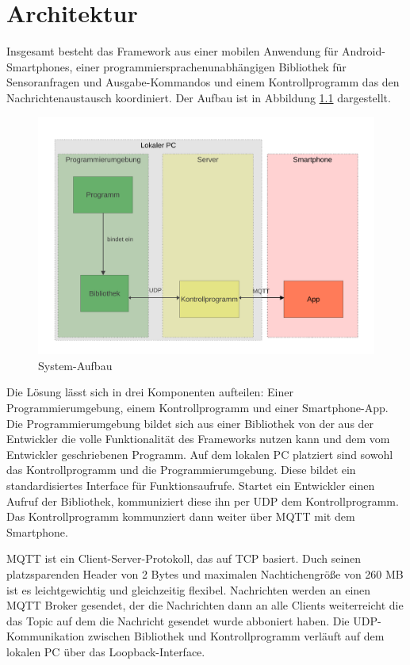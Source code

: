 \documentclass[11pt,a4paper]{report}
\begin{document}
\chapter{Architektur} \label{chap:architektur}
Insgesamt besteht das Framework aus einer mobilen Anwendung für Android-Smartphones, einer programmiersprachenunabhängigen Bibliothek für Sensoranfragen und Ausgabe-Kommandos und einem Kontrollprogramm das den Nachrichtenaustausch koordiniert.
Der Aufbau ist in Abbildung \ref{fig:design} dargestellt.
\begin{figure}[htbp]
\centering
\includegraphics[width=\textwidth]{images/framework.pdf}
\caption{System-Aufbau}
\label{fig:design}
\end{figure}
Die Lösung lässt sich in drei Komponenten aufteilen:
Einer Programmierumgebung, einem Kontrollprogramm und einer Smartphone-App.
Die Programmierumgebung bildet sich aus einer Bibliothek von der aus der Entwickler die volle Funktionalität des Frameworks nutzen kann und dem vom Entwickler geschriebenen Programm.
Auf dem lokalen PC platziert sind sowohl das Kontrollprogramm und die Programmierumgebung.
Diese bildet ein standardisiertes Interface für Funktionsaufrufe.
Startet ein Entwickler einen Aufruf der Bibliothek, kommuniziert diese ihn per UDP dem Kontrollprogramm.
Das Kontrollprogramm kommunziert dann weiter über MQTT mit dem Smartphone.

MQTT ist ein Client-Server-Protokoll, das auf TCP basiert.
Duch seinen platzsparenden Header von 2 Bytes und maximalen Nachtichengröße von 260 MB ist es leichtgewichtig und gleichzeitig flexibel.
Nachrichten werden an einen MQTT Broker gesendet, der die Nachrichten dann an alle Clients weiterreicht die das Topic auf dem die Nachricht gesendet wurde abboniert haben.
Die UDP-Kommunikation zwischen Bibliothek und Kontrollprogramm verläuft auf dem lokalen PC über das Loopback-Interface.
\end{document}
